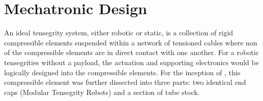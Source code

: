 \chapter{Mechatronic Design}

An ideal tensegrity system, either robotic or static, is a collection of rigid compressible elements suspended within a network of tensioned cables where non of the compressible elements are in direct contact with one another. 
For a robotic tensegrities without a payload, the actuation and supporting electronics would be logically designed into the compressible elements. 
For the inception of \SB{}, this compressible element was further dissected into three parts: two identical end caps (Modular Tensegrity Robots) and a section of tube stock.






